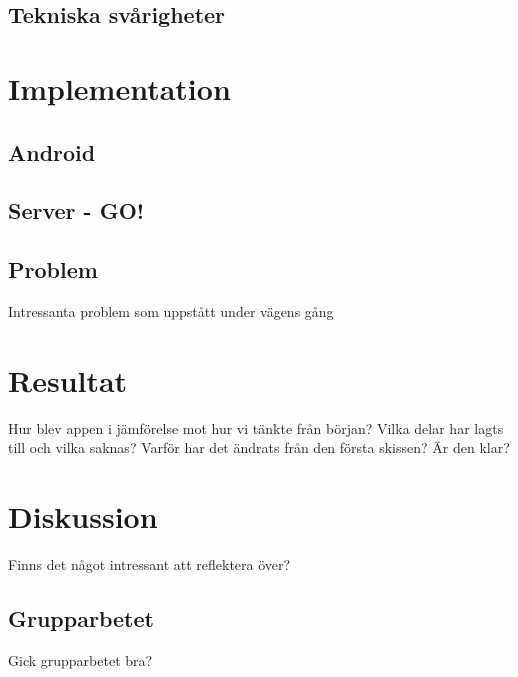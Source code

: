 \documentclass[12pt,a4paper]{article}
\begin{document}
\subsection{Tekniska svårigheter}
\section{Implementation}
\subsection{Android}
\subsection{Server - GO!}
\subsection{Problem}
Intressanta problem som uppstått under vägens gång

\section{Resultat}
Hur blev appen i jämförelse mot hur vi tänkte från början? Vilka delar har lagts till och vilka saknas? Varför har det ändrats från den första skissen? Är den klar?
\section{Diskussion}
Finns det något intressant att reflektera över?
\subsection{Grupparbetet}
Gick grupparbetet bra?
\end{document}
